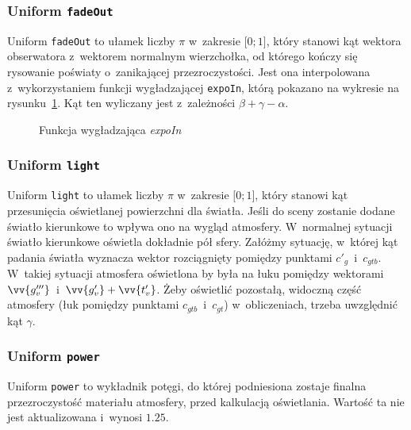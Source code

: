 \subsubsection{Uniform \texttt{fadeOut}}
Uniform \texttt{fadeOut} to ułamek liczby $\pi$ w~zakresie $\lbrack0; 1\rbrack$, który stanowi kąt wektora obserwatora z~wektorem normalnym wierzchołka, od którego kończy się rysowanie poświaty o~zanikającej przezroczystości. Jest ona interpolowana z~wykorzystaniem funkcji wygładzającej \texttt{expoIn}, którą pokazano na wykresie na rysunku~\ref{fig:c4_expoIn}. Kąt ten wyliczany jest z~zależności $\beta+\gamma-\alpha$.
\begin{figure}[h]
  \centering
  \caption{Funkcja wygładzająca \textit{expoIn}}
  \label{fig:c4_expoIn}
\end{figure}
\subsubsection{Uniform \texttt{light}}
Uniform \texttt{light} to ułamek liczby $\pi$ w~zakresie $\lbrack0; 1\rbrack$, który stanowi kąt przesunięcia oświetlanej powierzchni dla światła. Jeśli do sceny zostanie dodane światło kierunkowe to wpływa ono na wygląd atmosfery. W~normalnej sytuacji światło kierunkowe oświetla dokładnie pół sfery. Załóżmy sytuację, w~której kąt padania światła wyznacza wektor rozciągnięty pomiędzy punktami $c'_g$~i~$c_{gtb}$. W~takiej sytuacji atmosfera oświetlona by była na łuku pomiędzy wektorami $\vv {g'''_v}$~i~$\vv {g'_v} + \vv{t'_v}$. Żeby oświetlić pozostałą, widoczną część atmosfery (łuk pomiędzy punktami $c_{gtb}$~i~$c_{gt}$) w~obliczeniach, trzeba uwzględnić kąt $\gamma$.

\subsubsection{Uniform \texttt{power}}
Uniform \texttt{power} to wykładnik potęgi, do której podniesiona zostaje finalna przezroczystość materiału atmosfery, przed kalkulacją oświetlania. Wartość ta nie jest aktualizowana i~wynosi $1.25$.

